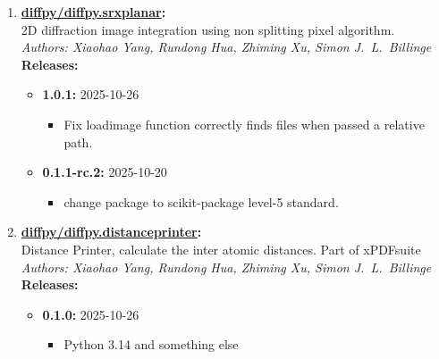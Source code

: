 \documentclass[prl,tighten,amsmath,amssymb,floatfix]{revtex4-1}
\begin{document}
\begin{enumerate}
  \item \textbf{\href{https://github.com/diffpy/diffpy.srxplanar}{diffpy/diffpy.srxplanar}:}\\
  \hspace*{1em}2D diffraction image integration using non splitting pixel algorithm.\\
  \hspace*{1em}\textit{Authors: Xiaohao Yang, Rundong Hua, Zhiming Xu, Simon J.~L.~Billinge}\\
  \hspace*{1em}\textbf{Releases:}\vspace{-0.5em}
  \begin{itemize}[label={}]
      \item \textbf{1.0.1:} 2025-10-26
      \begin{itemize}[label={}, leftmargin=2em]
        \item Fix loadimage function correctly finds files when passed a relative path.
      \end{itemize}
      \item \textbf{0.1.1-rc.2:} 2025-10-20
      \begin{itemize}[label={}, leftmargin=2em]
        \item change package to scikit-package level-5 standard.
      \end{itemize}
  \end{itemize}

  \item \textbf{\href{https://github.com/diffpy/diffpy.distanceprinter}{diffpy/diffpy.distanceprinter}:}\\
  \hspace*{1em}Distance Printer, calculate the inter atomic distances. Part of xPDFsuite\\
  \hspace*{1em}\textit{Authors: Xiaohao Yang, Rundong Hua, Zhiming Xu, Simon J.~L.~Billinge}\\
  \hspace*{1em}\textbf{Releases:}\vspace{-0.5em}
  \begin{itemize}[label={}]
    \item \textbf{0.1.0:} 2025-10-26
      \begin{itemize}[label={}, leftmargin=2em]
        \item Python 3.14 and something else
      \end{itemize}
  \end{itemize}

\end{enumerate}
\end{document}
